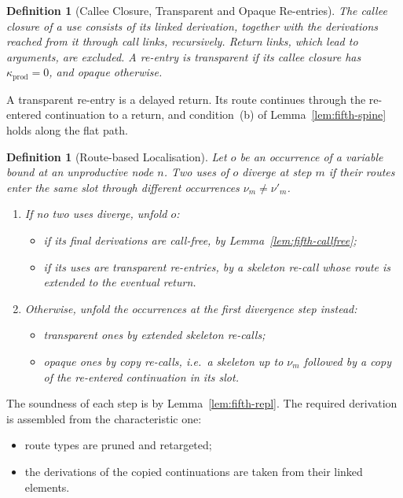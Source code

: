\documentclass[10pt,a4paper]{article}
\theoremstyle{plain}%
\newtheorem{definition}[theorem]{Definition}
\begin{document}
\begin{definition}[Callee Closure, Transparent and Opaque Re-entries]
The \emph{callee closure} of a use consists of its linked derivation, together with the derivations reached from it through call links, recursively.
Return links, which lead to arguments, are excluded.
A re-entry is \emph{transparent} if its callee closure has $\kappa_{\mathrm{prod}} = 0$, and \emph{opaque} otherwise.
\end{definition}

A transparent re-entry is a delayed return.
Its route continues through the re-entered continuation to a return, and condition~(b) of Lemma~\ref{lem:fifth-spine} holds along the flat path.

\begin{definition}[Route-based Localisation]
Let $o$ be an occurrence of a variable bound at an unproductive node $n$.
Two uses of $o$ \emph{diverge at step $m$} if their routes enter the same slot through different occurrences $\nu_m \neq \nu'_m$.
\begin{enumerate}
\item If no two uses diverge, unfold $o$:
\begin{itemize}
\item if its final derivations are call-free, by Lemma~\ref{lem:fifth-callfree};
\item if its uses are transparent re-entries, by a skeleton re-call whose route is extended to the eventual return.
\end{itemize}
\item Otherwise, unfold the occurrences at the first divergence step instead:
\begin{itemize}
\item transparent ones by extended skeleton re-calls;
\item opaque ones by \emph{copy re-calls}, i.e.\ a skeleton up to $\nu_m$ followed by a copy of the re-entered continuation in its slot.
\end{itemize}
\end{enumerate}
\end{definition}

The soundness of each step is by Lemma~\ref{lem:fifth-repl}.
The required derivation is assembled from the characteristic one:
\begin{itemize}
\item route types are pruned and retargeted;
\item the derivations of the copied continuations are taken from their linked elements.
\end{itemize}
\end{document}
